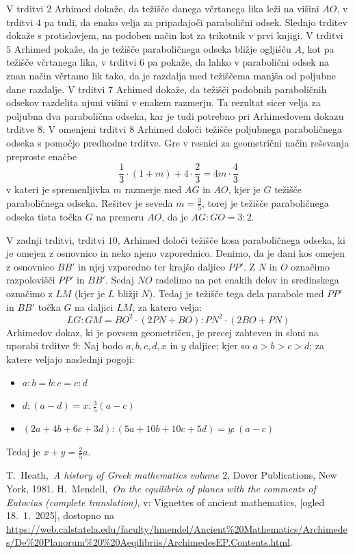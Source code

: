 \documentclass[a4paper, 10pt]{article}
\begin{document}
		V trditvi $2$ Arhimed dokaže, da težišče danega včrtanega lika leži na višini $AO$, v trditvi $4$ pa tudi, da enako velja za pripadajoči parabolični odsek. Slednjo trditev dokaže s protislovjem, na podoben način kot za trikotnik v prvi knjigi. V trditvi $5$ Arhimed pokaže, da je težišče paraboličnega odseka bližje ogljišču $A$, kot pa težišče včrtanega lika, v trditvi $6$ pa pokaže, da lahko v parabolični odsek na znan način včrtamo lik tako, da je razdalja med težiščema manjša od poljubne dane razdalje. V trditvi $7$ Arhimed dokaže, da težišči podobnih paraboličnih odsekov razdelita njuni višini v enakem razmerju. Ta rezultat sicer velja za poljubna dva parabolična odseka, kar je tudi potrebno pri Arhimedovem dokazu trditve $8$. V omenjeni trditvi $8$ Arhimed določi težišče poljubnega paraboličnega odseka s pomočjo predhodne trditve. Gre v resnici za geometrični način reševanja preproste enačbe $$\frac{1}{3}\cdot(1+m) + 4\cdot\frac{2}{3} = 4m\cdot\frac{4}{3}$$ v kateri je spremenljivka $m$ razmerje med $AG$ in $AO$, kjer je $G$ težišče paraboličnega odseka. Rešitev je seveda $m = \frac{3}{5}$, torej je težišče paraboličnega odseka tista točka $G$ na premeru $AO$, da je $AG:GO = 3:2$.
	
		V zadnji trditvi, trditvi $10$, Arhimed določi težišče kosa paraboličnega odseka, ki je omejen z osnovnico in neko njeno vzporednico. Denimo, da je dani kos omejen z osnovnico $BB'$ in njej vzporedno ter krajšo daljico $PP'$. Z $N$ in $O$ označimo razpolovišči $PP'$ in $BB'$. Sedaj $NO$ radelimo na pet enakih delov in sredinskega označimo z $LM$ (kjer je $L$ bližji $N$). Tedaj je težišče tega dela parabole med $PP'$ in $BB'$ točka $G$ na daljici $LM$, za katero velja:
		$$LG:GM = BO^2\cdot(2PN + BO):PN^2\cdot(2BO + PN)$$
		Arhimedov dokaz, ki je povsem geometričen, je precej zahteven in sloni na uporabi trditve $9$: Naj bodo $a, b, c, d, x$ in $y$ daljice; kjer so $a>b>c>d$; za katere veljajo naslednji pogoji: \begin{itemize}
		\item $a:b = b:c = c:d$
		\item $d:(a-d) = x: \frac{3}{5}(a-c)$
		\item $(2a+4b+6c+3d) : (5a+10b+10c+5d) = y: (a-c)$
		\end{itemize}
		Tedaj je $x + y = \frac{2}{5}a$.

	\begin{thebibliography}{99}
		
		 T.~Heath,~\emph{A history of Greek mathematics volume $2$}, Dover Publications, New York, 1981.
		 H.~Mendell,~\emph{On the equilibria of planes with the comments of Eutocius (complete translation)}, v: Vignettes of ancient mathematics, [ogled 18.~1.~2025], dostopno na \url{https://web.calstatela.edu/faculty/hmendel/Ancient%20Mathematics/Archimedes/De%20Planorum%20%20Aeqilibriis/ArchimedesEP.Contents.html}.
		
	\end{thebibliography}
\end{document}
